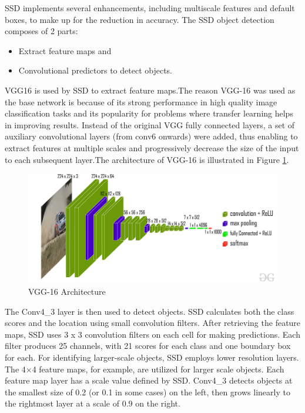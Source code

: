 \noindent
SSD implements several enhancements, including multiscale features and default boxes, to make up for the reduction 
in accuracy. The SSD object detection composes of 2 parts: 
\begin{itemize}
    \item Extract feature maps and
    \item Convolutional predictors to detect objects.
\end{itemize}
 VGG16 is used by SSD to extract feature maps.The reason VGG-16 was used as the base network is because of its strong performance in high quality image classification tasks and its popularity for problems where transfer learning helps in improving results. Instead of the original VGG fully connected layers, a set of auxiliary convolutional layers (from conv6 onwards) were added, thus enabling to extract features at multiple scales and progressively decrease the size of the input to each subsequent layer.The architecture of VGG-16 is illustrated in Figure \ref{fig:vgg16}.
 \begin{figure}[h]
     \centering
     \includegraphics[scale=0.3]{Figures/chapter3/vgg16.jpg}
     \caption{VGG-16 Architecture}
     \label{fig:vgg16}
 \end{figure}

 \noindent
The Conv4\_3 layer is then used to detect objects. SSD calculates both the class scores and the location using small convolution filters. After retrieving the feature maps, SSD uses 3 x 3 convolution filters on each cell for making predictions. Each filter produces 25 channels, with 21 scores for each class and one boundary box for each. For identifying larger-scale objects, SSD employs lower resolution layers. The 4×4 feature maps, for example, are utilized for larger scale objects. Each feature map layer has a scale value defined by SSD. Conv4\_3 detects objects at the smallest size of 0.2 (or 0.1 in some cases) on the left, then grows linearly to the rightmost layer at a scale of 0.9 on the right.

